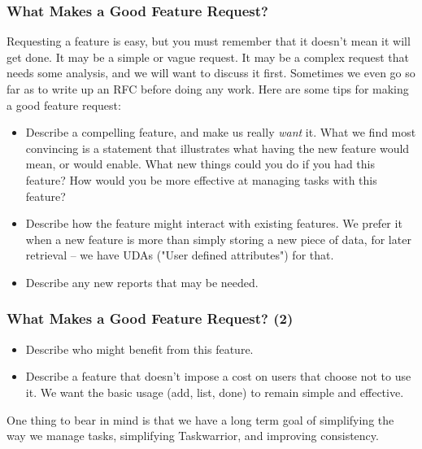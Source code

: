 \documentclass[t,handout]{beamer}
\begin{document}
\begin{frame}[fragile]\frametitle{What Makes a Good Feature Request?}
    Requesting a feature is easy, but you must remember that it doesn't mean it will get done. It may be a simple or vague request. It may be a complex request that needs some analysis, and we will want to discuss it first. Sometimes we even go so far as to write up an RFC before doing any work. Here are some tips for making a good feature request:

    \begin{itemize}
        \item Describe a compelling feature, and make us really \textit{want} it. What we find most convincing is a statement that illustrates what having the new feature would mean, or would enable. What new things could you do if you had this feature? How would you be more effective at managing tasks with this feature?
        \item Describe how the feature might interact with existing features. We prefer it when a new feature is more than simply storing a new piece of data, for later retrieval -- we have UDAs ("User defined attributes") for that.
        \item Describe any new reports that may be needed.
    \end{itemize}
\end{frame}

\begin{frame}[fragile]\frametitle{What Makes a Good Feature Request? (2)}
    \vfill
    \begin{itemize}
        \item Describe who might benefit from this feature.
        \item Describe a feature that doesn't impose a cost on users that choose not to use it. We want the basic usage (add, list, done) to remain simple and effective.
    \end{itemize}

    One thing to bear in mind is that we have a long term goal of simplifying the way we manage tasks, simplifying Taskwarrior, and improving consistency.
\end{frame}
\end{document}
